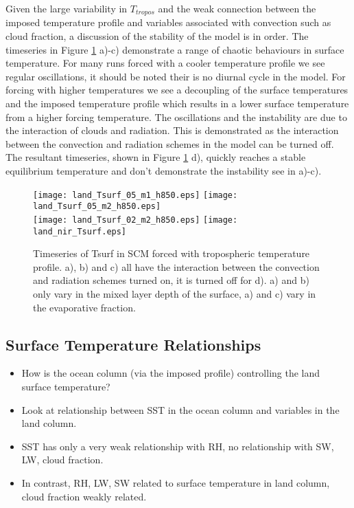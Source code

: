 Given the large variability in $T_{tropos}$ and the weak connection between the 
imposed temperature profile and variables associated with convection such as 
cloud fraction, a discussion of the stability of the model is in order. The 
timeseries in Figure \ref{fig:scmts} a)-c) demonstrate a range of chaotic 
behaviours in surface temperature. For many runs forced with a cooler 
temperature profile we see regular oscillations, it should be noted their is no 
diurnal cycle in the model.  For forcing with higher temperatures we see a 
decoupling of the surface temperatures and the imposed temperature profile which 
results in a lower surface temperature from a higher forcing temperature.  The 
oscillations and the instability are due to the interaction of clouds and 
radiation. This is demonstrated as the interaction between the convection and 
radiation schemes in the model can be turned off. The resultant timeseries, 
shown in Figure \ref{fig:scmts} d), quickly reaches a stable equilibrium 
temperature and don't demonstrate the instability see in a)-c).

\begin{figure}[ht]
\texttt{[image: land\_Tsurf\_05\_m1\_h850.eps]}
\texttt{[image: land\_Tsurf\_05\_m2\_h850.eps]}\\
\texttt{[image: land\_Tsurf\_02\_m2\_h850.eps]}
\texttt{[image: land\_nir\_Tsurf.eps]}\\
\caption{Timeseries of Tsurf in SCM forced with tropospheric temperature 
profile. a), b) and c) all have the interaction between the convection and 
radiation schemes turned on, it is turned off for d). a) and b) only vary in the 
mixed layer depth of the surface, a) and c) vary in the evaporative fraction.}
\label{fig:scmts}
\end{figure}



\clearpage


\subsection{Surface Temperature Relationships}

\begin{itemize}
	\item How is the ocean column (via the imposed profile) controlling the land 
		surface temperature?
	\item Look at relationship between SST in the ocean column and variables in 
		the land column.
	\item SST has only a very weak relationship with RH, no relationship with 
		SW, LW, cloud fraction.
	\item In contrast, RH, LW, SW related to surface temperature in land column, 
cloud fraction weakly related.
\end{itemize}

